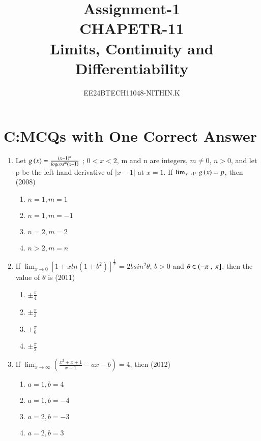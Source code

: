 \documentclass[journal,12pt,twocolumn]{IEEEtran}
\theoremstyle{remark}
\begin{document}


\title{Assignment-1\\CHAPETR-11\\Limits, Continuity and Differentiability}
\author{EE24BTECH11048-NITHIN.K} 
\maketitle
\newpage
\bigskip

\renewcommand{\thefigure}{\theenumi}
\renewcommand{\thetable}{\theenumi}


\section{C:MCQs with One Correct Answer}


\begin{enumerate}
\item Let $g\left(x\right)= \frac{(x-1)^n}{logcos^m(x-1)}$ ; $0<x<2$, m and n are integers, $m\neq0$, $n>0$, and let p be the left hand derivative of $|x-1|$ at $x=1$. If $\lim_{x \to 1^+}{g\left(x\right)=p}$, then \hfill{(2008)} 

\begin{enumerate}[label=\alph*)]
    \item $n=1,m=1$
    \item $n=1,m=-1$
    \item $n=2,m=2$
    \item $n>2,m=n$ \\
\end{enumerate}
\item If $\lim_{x \to 0}[1+xln(1+b^2)]^\frac{1}{x}$ = $2bsin^2\theta$, $b>0$ and $\theta \in \left(-\pi\right.,{}\left.\pi\right]$, then the value of $\theta$ is 
\hfill{(2011)} 

\begin{enumerate}[label=\alph*)]
    \item $\pm\frac{\pi}{4}$
    \item $\pm\frac{\pi}{3}$
    \item $\pm\frac{\pi}{6}$
    \item $\pm\frac{\pi}{2}$ \\
\end{enumerate} 
\item If $\lim_{ x \to \infty}(\frac{x^2+x+1}{x+1}-ax-b) = 4$, then \hfill{(2012)} 

\begin{enumerate}[label=\alph*)]
    \item $a=1,b=4$
    \item $a=1,b=-4$
    \item $a=2,b=-3$
    \item $a=2,b=3$ \\
\end{enumerate}


\end{enumerate}
\end{document}
